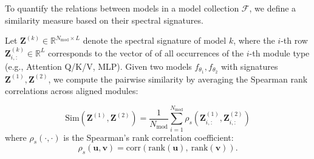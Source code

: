 To quantify the relations between models in a model collection $\mathcal{F}$, we define a similarity measure based on their spectral signatures. 

Let $\mathbf{Z}^{(k)} \in \mathbb{R}^{N_{\text{mod}} \times L}$ denote the spectral signature of model $k$, where the $i$-th row $\mathbf{Z}^{(k)}_{i, :}\in\mathbb{R}^{L}$ corresponds to the vector of \ALPHAHILL of all occurrences of the $i$-th module type (e.g., Attention Q/K/V, MLP).
Given two models $f_{\theta_1}, f_{\theta_2}$ with signatures $\mathbf{Z}^{(1)}, \mathbf{Z}^{(2)}$, we compute the pairwise similarity by averaging the Spearman rank correlations across aligned modules:


\begin{equation}
\mathrm{Sim}(\mathbf{Z}^{(1)}, \mathbf{Z}^{(2)}) = \frac{1}{N_{\text{mod}}} \sum_{i=1}^{N_{\text{mod}}} \rho_s(\mathbf{Z}^{(1)}_{i, :}, \mathbf{Z}^{(2)}_{i, :})
\label{eq:similarity}
\end{equation}
where $\rho_s(\cdot, \cdot)$ is the Spearman's rank correlation coefficient:
\begin{equation}
\rho_s(\mathbf{u}, \mathbf{v}) = \mathrm{corr}\!\left(\mathrm{rank}(\mathbf{u}),~\mathrm{rank}(\mathbf{v})\right).
\label{eq:sr}
\end{equation}


 

